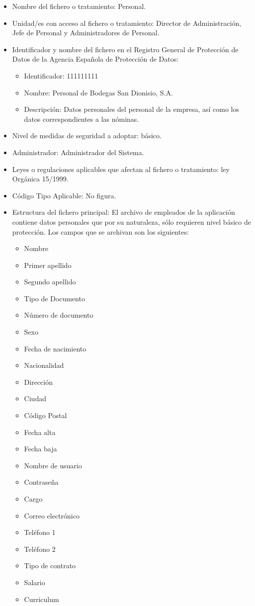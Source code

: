 \documentclass[a4paper,11pt,bibtotoc,noliststotoc]{scrbook}
\newcommand{\laorganizacion}{Bodegas San Dionisio, S.A.}
\begin{document}
\begin{itemize}
\item Nombre del fichero o tratamiento: Personal.

\item Unidad/es con acceso al fichero o tratamiento: Director de Administración, Jefe de Personal y Administradores de Personal.

\item Identificador y nombre del fichero en el Registro General de Protección de Datos de la Agencia Española de Protección de Datos:

	\begin{itemize}
	\item Identificador: 111111111
	\item Nombre: Personal de \laorganizacion
	\item Descripción: Datos personales del personal de la empresa, así como los datos correspondientes a las nóminas.
	\end{itemize}

\item Nivel de medidas de seguridad a adoptar: básico.

\item Administrador: Administrador del Sistema.

\item Leyes o regulaciones aplicables que afectan al fichero o tratamiento: ley Orgánica 15/1999.

\item Código Tipo Aplicable: No figura.

\item Estructura del fichero principal: 
El archivo de empleados de la aplicación contiene datos personales que por su naturaleza, sólo requieren nivel básico de protección. Los campos que se archivan son los siguientes:
\begin{itemize}
\item Nombre
\item Primer apellido
\item Segundo apellido
\item Tipo de Documento
\item Número de documento
\item Sexo
\item Fecha de nacimiento
\item Nacionalidad
\item Dirección
\item Ciudad
\item Código Postal
\item Fecha alta
\item Fecha baja
\item Nombre de usuario
\item Contraseña
\item Cargo
\item Correo electrónico
\item Teléfono 1
\item Teléfono 2
\item Tipo de contrato
\item Salario
\item Curriculum
\end{itemize}



\end{itemize}
\end{document}
